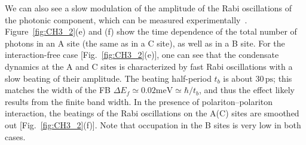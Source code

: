 We can also see a slow modulation of the amplitude of the Rabi oscillations of the photonic component, which can be measured experimentally~\cite{Dominici:2014aa}.
Figure~\ref{fig:CH3_2}(e) and (f) show the time dependence of the total number of photons in an A site (the same as in a C site), as well as in a B site.
For the interaction-free case [Fig.~\ref{fig:CH3_2}(e)], one can see that the condensate dynamics at the A and C sites is characterized by fast Rabi oscillations with a slow beating of their amplitude.
The beating half-period $t_b$ is about $30\,\mathrm{ps}$; this matches the width of the FB ${\Delta}E_f\simeq0.02\mathrm{meV}\simeq\hbar/t_b$, and thus the effect likely results from the finite band width.
In the presence of polariton--polariton interaction, the beatings of the Rabi oscillations on the A(C) sites are smoothed out [Fig.~\ref{fig:CH3_2}(f)]. Note that occupation in the B sites is very low in both cases.

%
%
